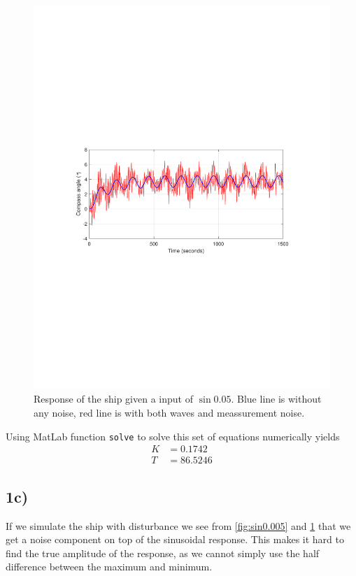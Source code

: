 \begin{figure}
	\centering
	\includegraphics[width=\textwidth]{images/oppg1/sin005.pdf}
	\caption{Response of the ship given a input of \ensuremath{\sin{0.05}}.
		Blue line is without any noise, red line is with both waves and meassurement noise.}
	\label{fig:sin0.05}
\end{figure}

Using MatLab function \texttt{solve} to solve this set of equations numerically yields
\begin{subequations}
	\begin{align}
		K &= 0.1742 \\
		T &= 86.5246
	\end{align}
\end{subequations}

\subsection{1c)}

If we simulate the ship with disturbance we see from \cref{fig:sin0.005}  and \cref{fig:sin0.05} that we get a noise component on top of the sinusoidal response. This makes it hard to find the true amplitude of the response, as we cannot simply use the half difference between the maximum and minimum.

